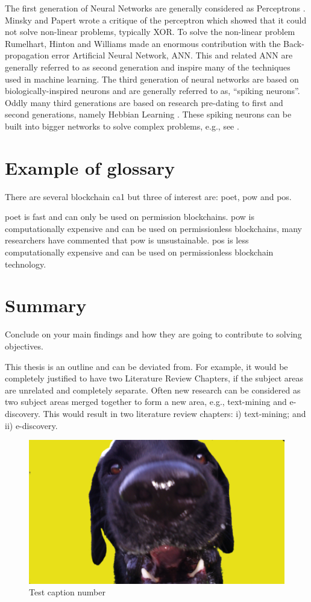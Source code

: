 The first generation of Neural Networks are generally considered as Perceptrons \cite{rosenblatt1958perceptron}. Minsky and Papert \cite{minsky1969perceptrons} wrote a critique of the perceptron which showed that it could not solve non-linear problems, typically XOR. To solve the non-linear problem Rumelhart, Hinton and Williams \cite{rumelhart1988learning} made an enormous contribution with the Back-propagation error Artificial Neural Network, ANN. This and related ANN are generally referred to as second generation and inspire many of the techniques used in machine learning. The third generation of neural networks are based on biologically-inspired neurons and are generally referred to as, ``spiking neurons''.  Oddly many third generations are based on research pre-dating to first and second generations, namely Hebbian Learning \cite{Hebb}. These spiking neurons can be built into bigger networks to solve complex problems, e.g., see \cite{huyck2013compensatory}.

\section{Example of glossary}
There are several blockchain \gls{ca1} but three of interest are: \gls{poet}, \gls{pow} and \gls{pos}.

\gls{poet} is fast and can only be used on permission blockchains. \gls{pow} is computationally expensive and can be used on permissionless blockchains, many researchers have commented that \gls{pow} is unsustainable. \gls{pos} is less computationally expensive and can be used on permissionless blockchain technology. 

\section{Summary}
Conclude on your main findings and how they are going to contribute to solving objectives.

This thesis is an outline and can be deviated from. For example, it would be completely justified to have two Literature Review Chapters, if the subject areas are unrelated and completely separate. Often new research can be considered as two subject areas merged together to form a new area, e.g., text-mining and e-discovery. This would result in two literature review chapters: i) text-mining; and ii) e-discovery. 

\begin{figure}
	\centering
	\includegraphics[scale=0.1]{ch2/awo}
	\caption{Test caption number}
\end{figure}
